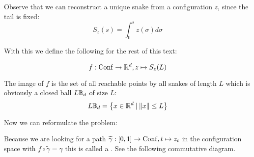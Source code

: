\begin{remark}
    Observe that we can reconstruct a unique snake from a configuration $z$,
    since the tail is fixed:
    \[
        S_z(s) = \int_0^s z(\sigma) d\sigma
    \]
\end{remark}

With this we define the following for the rest of this text:
\begin{definition}
    \[f : \operatorname{Conf} \rightarrow \mathbb{R}^d, z \mapsto S_z(L)\]
\end{definition}

The image of $f$ is the set of all reachable points by all snakes of
length $L$ which is obviously a closed ball $L\mathbb{B}_{d}$ of size $L$:
\[
    L\mathbb{B}_{d} = \left\{{x \in \mathbb{R}^d} \:|\: {\left\Vert{x}\right\Vert \leq L}\right\}
\]

Now we can reformulate the problem:

\begin{remark}\label{rem:path_lift}
    Because we are looking for a path
    $\widetilde{\gamma} : [0,1] \rightarrow \operatorname{Conf}, t \mapsto z_t$
    in the configuration space with $f \circ \widetilde{\gamma} = \gamma$ this
    is called a . See the following commutative diagram.

    \begin{center}
    \end{center}
\end{remark}

